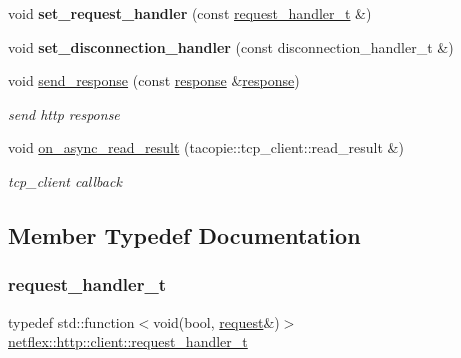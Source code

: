\begin{DoxyCompactItemize}
void {\bfseries set\+\_\+request\+\_\+handler} (const \hyperlink{classnetflex_1_1http_1_1client_aeac22a78222d25d3224bf50b8e44fb2d}{request\+\_\+handler\+\_\+t} \&)
\item 
\mbox{\label{classnetflex_1_1http_1_1client_a19c20f06646dc840257883f50e5ad8d5}} 
void {\bfseries set\+\_\+disconnection\+\_\+handler} (const disconnection\+\_\+handler\+\_\+t \&)
\item 
\mbox{\label{classnetflex_1_1http_1_1client_a8b00e06dfa90d8c96f9773ce043d0776}} 
void \hyperlink{classnetflex_1_1http_1_1client_a8b00e06dfa90d8c96f9773ce043d0776}{send\+\_\+response} (const \hyperlink{classnetflex_1_1http_1_1response}{response} \&\hyperlink{classnetflex_1_1http_1_1response}{response})
\begin{DoxyCompactList}\small\item\em send http response \end{DoxyCompactList}\item 
\mbox{\label{classnetflex_1_1http_1_1client_ac0efa9afc9099104d8612da474d01b00}} 
void \hyperlink{classnetflex_1_1http_1_1client_ac0efa9afc9099104d8612da474d01b00}{on\+\_\+async\+\_\+read\+\_\+result} (tacopie\+::tcp\+\_\+client\+::read\+\_\+result \&)
\begin{DoxyCompactList}\small\item\em tcp\+\_\+client callback \end{DoxyCompactList}\end{DoxyCompactItemize}


\subsection{Member Typedef Documentation}
\mbox{\label{classnetflex_1_1http_1_1client_aeac22a78222d25d3224bf50b8e44fb2d}} 
\subsubsection{\texorpdfstring{request\+\_\+handler\+\_\+t}{request\_handler\_t}}
{\footnotesize\ttfamily typedef std\+::function$<$void(bool, \hyperlink{classnetflex_1_1http_1_1request}{request}\&)$>$ \hyperlink{classnetflex_1_1http_1_1client_aeac22a78222d25d3224bf50b8e44fb2d}{netflex\+::http\+::client\+::request\+\_\+handler\+\_\+t}}

